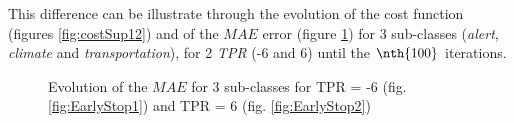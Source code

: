 \documentclass[twocolumn,a4paper,10pt]{article}
\begin{document}
This difference can be illustrate through the evolution of the cost function (figures \ref{fig:costSup12}) and of the $MAE$ error (figure \ref{fig:EarlyStop12}) for 3 sub-classes (\textit{alert}, \textit{climate} and \textit{transportation}), for 2 \textit{TPR} (-6 and 6) until the $\nth {100}$ iterations.\\

\begin{figure}
    \centering
    \caption{Evolution of the $MAE$ for 3 sub-classes for TPR = -6 (fig.  \ref{fig:EarlyStop1}) and TPR = 6 (fig. \ref{fig:EarlyStop2})}
    \label{fig:EarlyStop12}
\end{figure}
\end{document}
